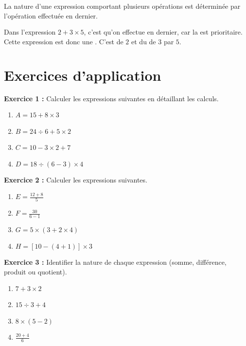 \begin{definitionbox}
La nature d'une expression comportant plusieurs opérations est déterminée par l'opération effectuée en dernier.
\end{definitionbox}

\begin{examplebox}
Dans l'expression $2 + 3 \times 5$, c'est \trous{5cm} qu'on effectue en dernier, car la \trous{5cm} est prioritaire. Cette expression est donc une \trous{5cm}. C'est \trous{5cm} de $2$ et du \trous{5cm} de $3$ par $5$.
\end{examplebox}

\section{Exercices d'application}
\begin{exercisebox}
\textbf{Exercice 1 :} Calculer les expressions suivantes en détaillant les calculs.

\begin{enumerate}[label=\alph*)]
\item $A = 15 + 8 \times 3$
\item $B = 24 \div 6 + 5 \times 2$
\item $C = 10 - 3 \times 2 + 7$
\item $D = 18 \div (6 - 3) \times 4$
\end{enumerate}

\textbf{Exercice 2 :} Calculer les expressions suivantes.

\begin{enumerate}[label=\alph*)]
	\item $E = \frac{12 + 8}{5}$
	\item $F = \frac{30}{6 - 1}$
	\item $G = 5 \times (3 + 2 \times 4)$
	\item $H = [10 - (4 + 1)] \times 3$
\end{enumerate}

\textbf{Exercice 3 :} Identifier la nature de chaque expression (somme, différence, produit ou quotient).

\begin{enumerate}[label=\alph*)]
	\item $7 + 3 \times 2$
	\item $15 \div 3 + 4$
	\item $8 \times (5 - 2)$
	\item $\frac{20 + 4}{6}$
\end{enumerate}
\end{exercisebox}


